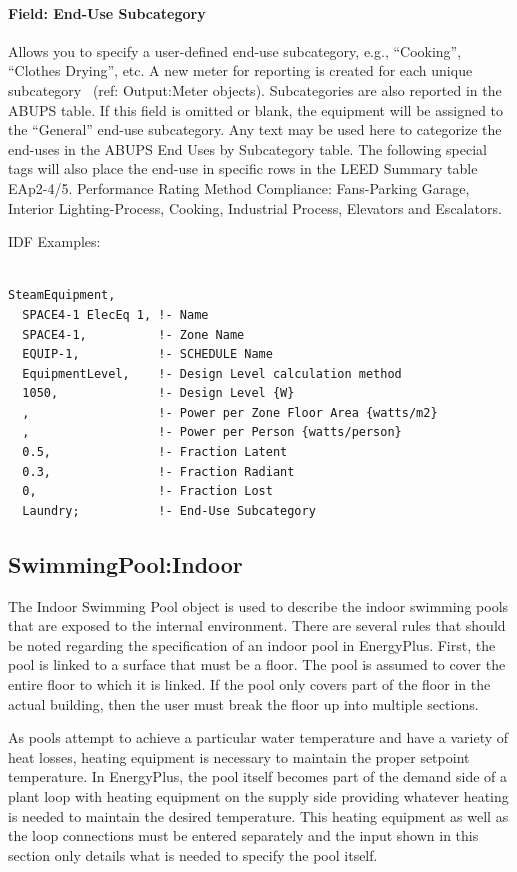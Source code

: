 \paragraph{Field: End-Use Subcategory}\label{field-end-use-subcategory-4-000}

Allows you to specify a user-defined end-use subcategory, e.g., ``Cooking'', ``Clothes Drying'', etc. A new meter for reporting is created for each unique subcategory~ (ref: Output:Meter objects). Subcategories are also reported in the ABUPS table. If this field is omitted or blank, the equipment will be assigned to the ``General'' end-use subcategory. Any text may be used here to categorize the end-uses in the ABUPS End Uses by Subcategory table. The following special tags will also place the end-use in specific rows in the LEED Summary table EAp2-4/5. Performance Rating Method Compliance:  Fans-Parking Garage, Interior Lighting-Process, Cooking, Industrial Process, Elevators and Escalators.

IDF Examples:

\begin{lstlisting}

SteamEquipment,
  SPACE4-1 ElecEq 1, !- Name
  SPACE4-1,          !- Zone Name
  EQUIP-1,           !- SCHEDULE Name
  EquipmentLevel,    !- Design Level calculation method
  1050,              !- Design Level {W}
  ,                  !- Power per Zone Floor Area {watts/m2}
  ,                  !- Power per Person {watts/person}
  0.5,               !- Fraction Latent
  0.3,               !- Fraction Radiant
  0,                 !- Fraction Lost
  Laundry;           !- End-Use Subcategory
\end{lstlisting}

\subsection{SwimmingPool:Indoor}\label{swimmingpoolindoor}

The Indoor Swimming Pool object is used to describe the indoor swimming pools that are exposed to the internal environment. There are several rules that should be noted regarding the specification of an indoor pool in EnergyPlus. First, the pool is linked to a surface that must be a floor. The pool is assumed to cover the entire floor to which it is linked. If the pool only covers part of the floor in the actual building, then the user must break the floor up into multiple sections.

As pools attempt to achieve a particular water temperature and have a variety of heat losses, heating equipment is necessary to maintain the proper setpoint temperature. In EnergyPlus, the pool itself becomes part of the demand side of a plant loop with heating equipment on the supply side providing whatever heating is needed to maintain the desired temperature. This heating equipment as well as the loop connections must be entered separately and the input shown in this section only details what is needed to specify the pool itself.


